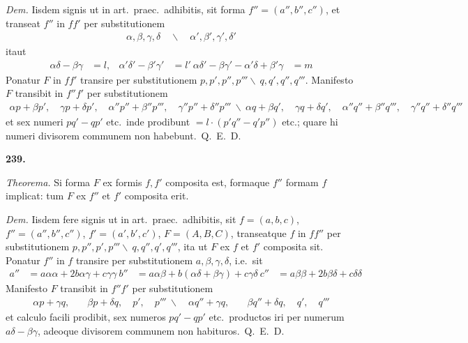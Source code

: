 \documentclass[12pt,a4paper]{article}
\theoremstyle{plain}
\theoremstyle{definition}
\theoremstyle{remark}
\begin{document}
\textit{Dem.} Iisdem signis ut in art.\ praec.\ adhibitis, sit forma $f'' = (a'', b'', c'')$, et transeat $f''$ in $ff'$ per substitutionem
\begin{align*}
\alpha, \beta, \gamma, \delta \quad \backslash \quad \alpha', \beta', \gamma', \delta'
\end{align*}
itaut
\begin{align*}
\alpha\delta - \beta\gamma &= l, & \alpha'\delta' - \beta'\gamma' &= l' \
\alpha\delta' - \beta\gamma' - \alpha'\delta + \beta'\gamma &= m
\end{align*}
Ponatur $F$ in $ff'$ transire per substitutionem $p, p', p'', p''' \backslash\ q, q', q'', q'''$. Manifesto $F$ transibit in $f''f'$ per substitutionem
\begin{gather*}
\alpha p + \beta p', \quad \gamma p + \delta p', \quad \alpha'' p'' + \beta'' p''', \quad \gamma'' p'' + \delta'' p''' \
\backslash \
\alpha q + \beta q', \quad \gamma q + \delta q', \quad \alpha'' q'' + \beta'' q''', \quad \gamma'' q'' + \delta'' q'''
\end{gather*}
et sex numeri $pq' - qp'$ etc.\ inde prodibunt $= l \cdot (p'q'' - q'p'')$ etc.; quare hi numeri divisorem communem non habebunt.\ Q.\ E.\ D.

\begin{center}\textbf{239.}\end{center}

\textit{Theorema.} Si forma $F$ ex formis $f, f'$ composita est, formaque $f''$ formam $f$ implicat: tum $F$ ex $f''$ et $f'$ composita erit.

\textit{Dem.} Iisdem fere signis ut in art.\ praec.\ adhibitis, sit $f = (a,b,c)$, $f'' = (a'',b'',c'')$, $f' = (a',b',c')$, $F = (A,B,C)$, transeatque $f$ in $ff''$ per substitutionem $p, p'', p', p''' \backslash\ q, q'', q', q'''$, ita ut $F$ ex $f$ et $f'$ composita sit. Ponatur $f''$ in $f$ transire per substitutionem $a, \beta, \gamma, \delta$, i.e.\ sit
\begin{align*}
a'' &= a\alpha\alpha + 2b\alpha\gamma + c\gamma\gamma \
b'' &= a\alpha\beta + b(\alpha\delta + \beta\gamma) + c\gamma\delta \
c'' &= a\beta\beta + 2b\beta\delta + c\delta\delta
\end{align*}
Manifesto $F$ transibit in $f''f'$ per substitutionem
\begin{align*}
\alpha p + \gamma q, &\quad \beta p + \delta q, \quad p', \quad p''' \
\backslash \quad
\alpha q'' + \gamma q, &\quad \beta q'' + \delta q, \quad q', \quad q'''
\end{align*}
et calculo facili prodibit, sex numeros $pq' - qp'$ etc.\ productos iri per numerum $a\delta - \beta\gamma$, adeoque divisorem communem non habituros.\ Q.\ E.\ D.
\end{document}
